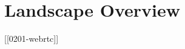 \hypertarget{landscape-overview}{%
\chapter{Landscape Overview}\label{landscape-overview}}

{[}{[}0201-webrtc{]}{]}

